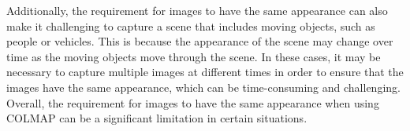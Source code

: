 Additionally, the requirement for images to have the same appearance can also make it challenging to capture a scene that includes moving objects, such as people or vehicles. This is because the appearance of the scene may change over time as the moving objects move through the scene. In these cases, it may be necessary to capture multiple images at different times in order to ensure that the images have the same appearance, which can be time-consuming and challenging. Overall, the requirement for images to have the same appearance when using COLMAP can be a significant limitation in certain situations.